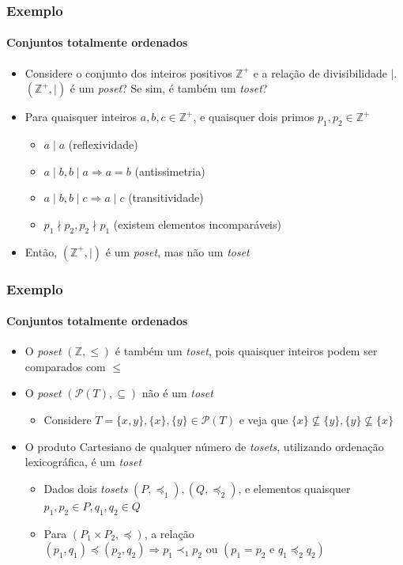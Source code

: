 \documentclass[12pt]{beamer}
\begin{document}
\begin{frame}
  \frametitle{Exemplo}
  \framesubtitle{Conjuntos totalmente ordenados}
  \begin{itemize}
    \item<1-> Considere o conjunto dos inteiros positivos $\mathbb{Z}^{+}$ e a
        relação de divisibilidade $\mid$. $(\mathbb{Z}^{+}, \mid)$ é um
          \emph{poset}? Se sim, é também um \emph{toset}?
    \item<2-> Para quaisquer inteiros $a, b, c \in \mathbb{Z}^{+}$, e quaisquer
        dois primos $p_1, p_2 \in \mathbb{Z}^{+}$
    \begin{itemize}[itemsep=0pt]
      \item<3-> $a \mid a$ (reflexividade)
      \item<4-> $a \mid b, b \mid a \Rightarrow a = b$ (antissimetria)
      \item<5-> $a \mid b, b \mid c \Rightarrow a \mid c$ (transitividade)
      \item<6-> $p_1 \nmid p_2, p_2 \nmid p_1$ (existem elementos incomparáveis)
    \end{itemize}
    \item<7-> Então, $(\mathbb{Z}^{+}, \mid)$ é um \emph{poset}, mas não um
        \emph{toset}
  \end{itemize}
\end{frame}

\begin{frame}
  \frametitle{Exemplo}
  \framesubtitle{Conjuntos totalmente ordenados}
  \begin{itemize}
    \item<1-> O \emph{poset} $(\mathbb{Z}, \leq)$ é também um \emph{toset},
        pois quaisquer inteiros podem ser comparados com $\leq$
    \item<2-> O \emph{poset} $(\mathcal{P}(T), \subseteq)$ não é um \emph{toset}
    \begin{itemize}
      \item Considere $T = \{x, y\}, \{x\}, \{y\} \in \mathcal{P}(T)$ e veja
          que $\{x\} \not\subseteq \{y\}, \{y\} \not\subseteq \{x\}$
    \end{itemize}
    \item<3-> O produto Cartesiano de qualquer número de \emph{tosets},
        utilizando ordenação lexicográfica, é um \emph{toset}
    \begin{itemize}[itemsep=0pt]
      \item Dados dois \emph{tosets} $(P, \preccurlyeq_1), (Q,
          \preccurlyeq_2)$, e elementos quaisquer $p_1, p_2 \in P, q_1, q_2 \in
            Q$
      \item Para $(P_1 \times P_2, \preccurlyeq)$, a relação $(p_1, q_1)
          \preccurlyeq (p_2, q_2) \Rightarrow p_1 \prec_1 p_2 \text{ ou } (p_1
            = p_2 \text{ e } q_1 \preccurlyeq_2 q_2)$
    \end{itemize}
  \end{itemize}
\end{frame}
\end{document}
